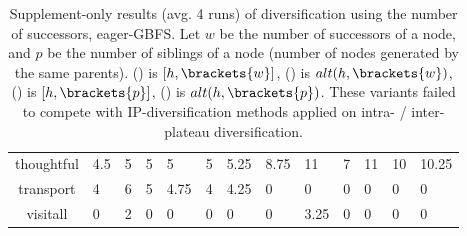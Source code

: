 \begin{table*}[htbp]
\begin{tabularx}{\linewidth}{|c|X|X|X|X|X|X||X|X|X|X|X|X|}
thoughtful      & 4.5    & 5      & 5      & 5      & 5      & 5.25   & 8.75   & 11     & 7      & 11     & 10     & 10.25  \\ 
transport       & 4      & 6      & 5      & 4.75   & 4      & 4.25   & 0      & 0      & 0      & 0      & 0      & 0      \\ 
visitall        & 0      & 2      & 0      & 0      & 0      & 0      & 0      & 3.25   & 0      & 0      & 0      & 0      \\ 
\end{tabularx}
\caption{
Supplement-only results (avg. 4 runs) of diversification using the number of successors, eager-GBFS.
Let $w$ be the number of successors of a node, and $p$ be the number of siblings of a node (number of nodes generated by the same parents).
() is $[h,\brackets{w}]$,
() is $alt(h,\brackets{w})$,
() is $[h,\brackets{p}]$,
() is $alt(h,\brackets{p})$.
These variants failed to compete with IP-diversification methods applied on intra- / inter-plateau diversification.
}
\label{tbl:hwWpP-eager}
\end{table*}


